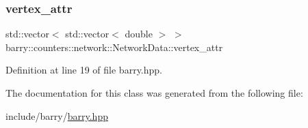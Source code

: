\subsubsection{\texorpdfstring{vertex\+\_\+attr}{vertex\_attr}}
{\footnotesize\ttfamily std\+::vector$<$ std\+::vector$<$ double $>$ $>$ barry\+::counters\+::network\+::\+Network\+Data\+::vertex\+\_\+attr}



Definition at line 19 of file barry.\+hpp.



The documentation for this class was generated from the following file\+:\begin{DoxyCompactItemize}
\item 
include/barry/\hyperlink{barry_8hpp}{barry.\+hpp}\end{DoxyCompactItemize}
